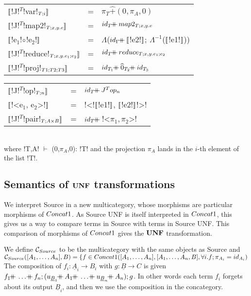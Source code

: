 \begin{tabular}{l c l}
    $\llbracket$!J!$^T$!var!$_{T;i} \rrbracket$ &=& $\pi_T \widehat{+}(0,\pi_A,0)$ \\
    $\llbracket$!J!$^T$!map2!$_{T;x,y.e}\rrbracket$  &=& $id_T\concatcomp map2_{T;x,y.e}$ \\
    $\llbracket$!e$_1$!$\circ$!e$_2$!$\rrbracket$ &=& $\Lambda$($id_\Gamma\concatcomp\seml$!e2!$\rrbracket$; $\Lambda^{-1}$($\llbracket$!e1!$\rrbracket$)) \\
    $\llbracket$!J!$^T$!reduce!$_{T;x,y.e_1;e_2}\rrbracket$  &=& $id_T\concatcomp reduce_{T;x,y.e_1;e_2}$ \\
    $\llbracket$!J!$^T$!proj!$_{T1;T2;T3} \rrbracket$ &=& $id_{T_1}\concatcomp\widehat{0}_{T_2}\concatcomp id_{T_3}$ 
    \end{tabular}
    \begin{tabular}{l c l}
    $\llbracket$!J!$^T$!op!$_{T;n} \rrbracket$ &=& $id_T\concatcomp J^Top_n$ \\
    $\llbracket$!<e$_1$, e$_2$>!$\rrbracket$  &=& !<!$\llbracket$!e1!$\rrbracket$, $\llbracket$!e2!$\rrbracket$!>! \\
    $\llbracket$!J!$^T$!pair!$_{T;A\times B} \rrbracket$ &=& $id_T\concatcomp$!<$\pi_1,\pi_2$>! \\
 \end{tabular}\\
 where !T,A! $\vdash$ (0,$\pi_A$,0): !T! and the projection $\pi_A$ lands in the $i$-th element of the list !T!.

\subsection{Semantics of $\mathbf{UNF}$ transformations} %
\label{sub:Semantics for UNF transformations}

We interpret Source in a new multicategory, 
whose morphisms are particular morphisms of $Concat1$.
As Source UNF is itself interpreted in $Concat1$, 
this gives us a way to compare terms in Source with terms in Source UNF.
This comparison of morphisms of $Concat1$ gives the $\mathbf{UNF}$ transformation.

\begin{definition}
    We define $\mathcal{C}_{Source}$ to be the multicategory with the same objects as Source and\\ 
    $\mathcal{C}_{Source}([A_1,\ldots,A_n],B)=\{f\in Concat1([A_1,\ldots,A_n],[A_1,\ldots,A_n,B], \forall i.f;\pi_{A_i}=id_{A_i})$\\
    The composition of $f_i:\underline{A}_i\to B_i$ with $g:\underline{B}\to C$ is given 
    $f_1\concatcomp\ldots\concatcomp f_n;(u_{\underline{B}_1}\concatcomp A_1 \concatcomp \ldots \concatcomp u_{\underline{B}_n}\concatcomp A_n);g$.
    In other words each term $f_i$ forgets about its output $\underline{B}_i$, and then we use the composition in the concategory.
\end{definition}

